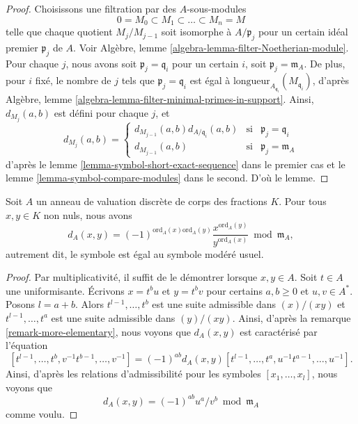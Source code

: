 \begin{proof}
Choisissons une filtration par des $A$-sous-modules
$$
0 = M_0 \subset M_1 \subset \ldots \subset M_n = M
$$
telle que chaque quotient $M_j/M_{j - 1}$ soit isomorphe
à $A/\mathfrak p_j$ pour un certain idéal premier $\mathfrak p_j$
de $A$. Voir Algèbre, lemme \ref{algebra-lemma-filter-Noetherian-module}.
Pour chaque $j$, nous avons soit $\mathfrak p_j = \mathfrak q_i$
pour un certain $i$, soit $\mathfrak p_j = \mathfrak m_A$. De plus,
pour $i$ fixé, le nombre de $j$ tels que
$\mathfrak p_j = \mathfrak q_i$ est égal à
$\text{longueur}_{A_{\mathfrak q_i}}(M_{\mathfrak q_i})$, d'après
Algèbre, lemme \ref{algebra-lemma-filter-minimal-primes-in-support}.
Ainsi, $d_{M_j}(a, b)$ est défini pour chaque $j$, et
$$
d_{M_j}(a, b)
=
\left\{
\begin{matrix}
d_{M_{j - 1}}(a, b) d_{A/\mathfrak q_i}(a, b) &
\text{si} & \mathfrak p_j = \mathfrak q_i \\
d_{M_{j - 1}}(a, b) & \text{si} & \mathfrak p_j = \mathfrak m_A
\end{matrix}
\right.
$$
d'après le lemme \ref{lemma-symbol-short-exact-sequence} dans le premier cas
et le lemme \ref{lemma-symbol-compare-modules} dans le second. D'où le lemme.
\end{proof}

\begin{lemma}
\label{lemma-symbol-is-usual-tame-symbol}
Soit $A$ un anneau de valuation discrète de corps des fractions $K$.
Pour tous $x, y \in K$ non nuls, nous avons
$$
d_A(x, y)
=
(-1)^{\text{ord}_A(x)\text{ord}_A(y)}
\frac{x^{\text{ord}_A(y)}}{y^{\text{ord}_A(x)}} \bmod \mathfrak m_A,
$$
autrement dit, le symbole est égal au symbole modéré usuel.
\end{lemma}

\begin{proof}
Par multiplicativité, il suffit de le démontrer lorsque $x, y \in A$.
Soit $t \in A$ une uniformisante.
Écrivons $x = t^bu$ et $y = t^bv$ pour certains $a, b \geq 0$
et $u, v \in A^*$. Posons $l = a + b$. Alors
$t^{l - 1}, \ldots, t^b$ est une suite admissible dans
$(x)/(xy)$ et $t^{l - 1}, \ldots, t^a$ est une suite admissible
dans $(y)/(xy)$. Ainsi, d'après la remarque \ref{remark-more-elementary},
nous voyons que $d_A(x, y)$ est caractérisé par l'équation
$$
[t^{l - 1}, \ldots, t^b, v^{-1}t^{b - 1}, \ldots, v^{-1}]
=
(-1)^{ab} d_A(x, y)
[t^{l - 1}, \ldots, t^a, u^{-1}t^{a - 1}, \ldots, u^{-1}].
$$
Ainsi, d'après les relations d'admissibilité pour les
symboles $[x_1, \ldots, x_l]$, nous voyons que
$$
d_A(x, y) = (-1)^{ab} u^a/v^b \bmod \mathfrak m_A
$$
comme voulu.
\end{proof}

